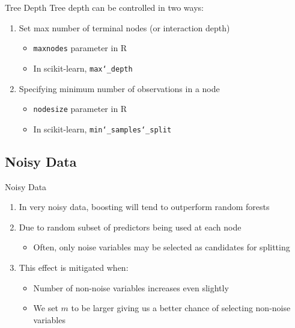 \documentclass[pdf]{beamer}
\begin{document}
		\begin{frame}{Tree Depth}
			Tree depth can be controlled in two ways:
			\vspace{5 mm}
			\begin{enumerate}
				\item{Set max number of terminal nodes (or interaction depth)}
					\begin{itemize}
						\item{\texttt{maxnodes} parameter in R}
						\item In scikit-learn, \texttt{max\char`_depth} 
					\end{itemize}
				
				\item{Specifying minimum number of observations in a node}
					\begin{itemize}
						\item{\texttt{nodesize} parameter in R}
						\item{In scikit-learn,  \texttt{min\char`_samples\char`_split}}
					\end{itemize}
			\end{enumerate}
		\end{frame}
	
	\subsection{Noisy Data}
		
		\begin{frame}{Noisy Data}
			\begin{enumerate}
				\item In very noisy data, boosting will tend to outperform random forests
				\item Due to random subset of predictors being used at each node
					\begin{itemize}
						\item Often, only noise variables may be selected as candidates for splitting
					\end{itemize}
				\item This effect is mitigated when:
					\begin{itemize}
						\item Number of non-noise variables increases even slightly
						\item We set $m$ to be larger giving us a better chance of selecting non-noise variables 
					\end{itemize}
			\end{enumerate}
		\end{frame}
		
\end{document}
